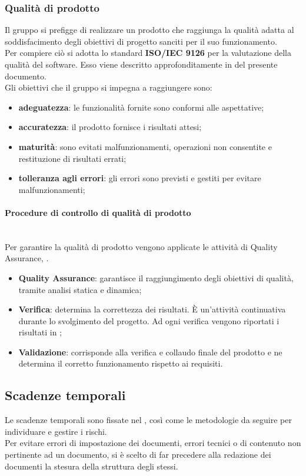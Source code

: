 \subsubsection{Qualità di prodotto}
Il gruppo si prefigge di realizzare un prodotto che raggiunga la qualità adatta al soddisfacimento degli obiettivi di progetto sanciti per il suo funzionamento.\\
Per compiere ciò si adotta lo standard \textbf{ISO/IEC 9126} per la valutazione della qualità del software. Esso viene descritto approfonditamente in  del presente documento.\\
Gli obiettivi che il gruppo si impegna a raggiungere sono:
\begin{itemize}
	\item \textbf{adeguatezza}: le funzionalità fornite sono conformi alle aspettative;
	\item \textbf{accuratezza}: il prodotto fornisce i risultati attesi;
	\item \textbf{maturità}: sono evitati malfunzionamenti, operazioni non consentite e restituzione di risultati errati;
	\item \textbf{tolleranza agli errori}: gli errori sono previsti e gestiti per evitare malfunzionamenti;
\end{itemize}


\paragraph{Procedure di controllo di qualità di prodotto}\mbox{}\\
Per garantire la qualità di prodotto vengono applicate le attività di Quality Assurance, \VV{}.
\begin{itemize}
	\item \textbf{Quality Assurance}: garantisce il raggiungimento degli obiettivi di qualità, tramite analisi statica e dinamica;
	\item \textbf{Verifica}: determina la correttezza dei risultati. \`{E} un’attività continuativa durante lo svolgimento del progetto. Ad ogni verifica vengono riportati i risultati in ;
	\item \textbf{Validazione}: corrisponde alla verifica e collaudo finale del prodotto e ne determina il corretto funzionamento rispetto ai requisiti.
\end{itemize}

\subsection{Scadenze temporali}
Le scadenze temporali sono fissate nel \PianoDiProgetto{}, così come le metodologie da seguire per individuare e gestire i rischi.\\
Per evitare errori di impostazione dei documenti, errori tecnici o di contenuto non pertinente ad un documento, si è scelto di far precedere alla redazione dei documenti la stesura della struttura degli stessi.

